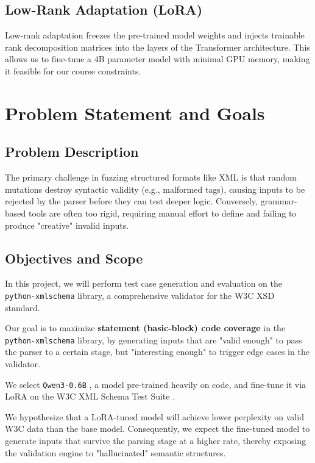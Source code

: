 \documentclass[11pt]{article}
\begin{document}
\subsection{Low-Rank Adaptation (LoRA)} Low-rank adaptation  \citep{hu2021loralowrankadaptationlarge} freezes the pre-trained model weights and injects trainable rank decomposition matrices into the layers of the Transformer architecture. This allows us to fine-tune a 4B parameter model with minimal GPU memory, making it feasible for our course constraints.

\section{Problem Statement and Goals}

\subsection{Problem Description}

The primary challenge in fuzzing structured formats like XML is that random mutations destroy syntactic validity (e.g., malformed tags), causing inputs to be rejected by the parser before they can test deeper logic. Conversely, grammar-based tools are often too rigid, requiring manual effort to define and failing to produce "creative" invalid inputs.

\subsection{Objectives and Scope}

In this project, we will perform test case generation and evaluation on the \texttt{python-xmlschema} library, a comprehensive validator for the W3C XSD standard. 

Our goal is to maximize \textbf{statement (basic-block) code coverage} in the \texttt{python-xmlschema} library, by generating inputs that are "valid enough" to pass the parser to a certain stage, but "interesting enough" to trigger edge cases in the validator.

We select \texttt{Qwen3-0.6B} \cite{qwen3}, a model pre-trained heavily on code, and fine-tune it via LoRA \cite{hu2021loralowrankadaptationlarge} on the W3C XML Schema Test Suite \cite{xmlschema}.

We hypothesize that a LoRA-tuned model will achieve lower perplexity on valid W3C data than the base model. Consequently, we expect the fine-tuned model to generate inputs that survive the parsing stage at a higher rate, thereby exposing the validation engine to "hallucinated" semantic structures.
\end{document}

